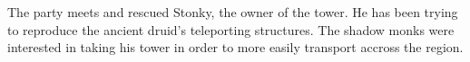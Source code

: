 The party meets and rescued Stonky, the owner of the tower.
He has been trying to reproduce the ancient druid's teleporting structures.
The shadow monks were interested in taking his tower in order to more easily transport accross the region.
